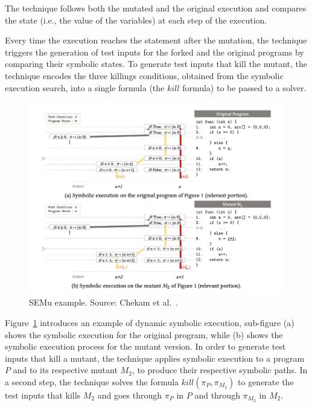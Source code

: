The technique follows both the mutated and the original execution and compares the state (i.e., the value of the variables) at each step of the execution.

Every time the execution reaches the statement after the mutation, the technique triggers the generation of test inputs for the forked and the original programs by comparing their symbolic states. To generate test inputs that kill the mutant, the technique encodes the three killings conditions, obtained from the symbolic execution search, into a single formula (the $kill$ formula) to be passed to a solver.

\begin{figure}[tb]
\begin{center}
\includegraphics[width=\textwidth]{images/semu-example}
\caption{SEMu example. Source: Chekam et al.~\cite{chekam2021killing}.}
\label{fig:semu-example}
\end{center}
\end{figure}

Figure~\ref{fig:semu-example} introduces an example of dynamic symbolic execution, sub-figure (a) shows the symbolic execution for the original program, while (b) shows the symbolic execution process for the mutant version. In order to generate test inputs that kill a mutant, the technique applies symbolic execution to a program $P$ and to its respective mutant $M_2$, to produce their respective symbolic paths. In a second step, the technique solves the formula $kill(\pi_P, \pi_{M_2})$ to generate the test inputs that kills $M_2$ and goes through $\pi_P$ in $P$ and through $\pi_{M_2}$ in $M_2$. 

